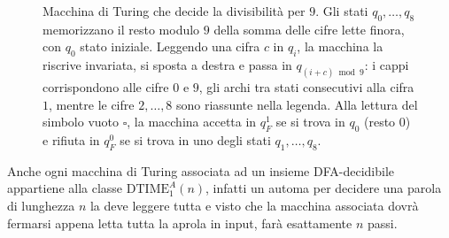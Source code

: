 \begin{exam}
\begin{figure}[H]
\caption{Macchina di Turing che decide la divisibilità per $9$. Gli stati $q_0,\dots,q_8$ memorizzano il resto modulo $9$ della somma delle cifre lette finora, con $q_0$ stato iniziale. Leggendo una cifra $c$ in $q_i$, la macchina la riscrive invariata, si sposta a destra e passa in $q_{(i+c) \bmod 9}$: i cappi corrispondono alle cifre $0$ e $9$, gli archi tra stati consecutivi alla cifra $1$, mentre le cifre $2,\dots,8$ sono riassunte nella legenda. Alla lettura del simbolo vuoto $\square$, la macchina accetta in $q_F^1$ se si trova in $q_0$ (resto $0$) e rifiuta in $q_F^0$ se si trova in uno degli stati $q_1,\dots,q_8$.}
\label{fig:tm-div9}
\end{figure}
\end{exam}

\begin{exam}
    Anche ogni macchina di Turing associata ad un insieme
    DFA-decidibile appartiene alla classe
    $\mathrm{DTIME}_1^{A}(n)$, infatti un automa per decidere 
    una parola di 
    lunghezza $n$ 
    la deve leggere tutta
    e visto che la macchina associata
    dovrà fermarsi appena letta
    tutta la aprola in input,
    farà esattamente
    $n$ passi.
\end{exam}


